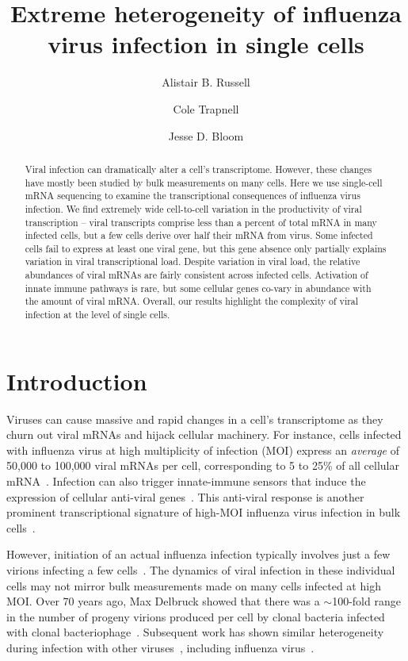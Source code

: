 \documentclass[9pt,lineno]{elife}
\title{Extreme heterogeneity of influenza virus infection in single cells}
\author[1]{Alistair B. Russell}
\author[2]{Cole Trapnell}
\author[1,2*]{Jesse D. Bloom}
\affil[1]{Basic Sciences Division and Computational Biology Program, Fred Hutchinson Cancer Research Center, Seattle, United States}
\affil[2]{Department of Genome Sciences, University of Washington, Seattle, United States}
\begin{document}
\maketitle

\begin{abstract}
Viral infection can dramatically alter a cell's transcriptome.
However, these changes have mostly been studied by bulk measurements on many cells.
Here we use single-cell mRNA sequencing to examine the transcriptional consequences of influenza virus infection.
We find extremely wide cell-to-cell variation in the productivity of viral transcription -- viral transcripts comprise less than a percent of total mRNA in many infected cells, but a few cells derive over half their mRNA from virus.
Some infected cells fail to express at least one viral gene, but this gene absence only partially explains variation in viral transcriptional load.
Despite variation in viral load, the relative abundances of viral mRNAs are fairly consistent across infected cells.
Activation of innate immune pathways is rare, but some cellular genes co-vary in abundance with the amount of viral mRNA.
Overall, our results highlight the complexity of viral infection at the level of single cells.
\end{abstract}

\section{Introduction}
Viruses can cause massive and rapid changes in a cell's transcriptome as they churn out viral mRNAs and hijack cellular machinery.
For instance, cells infected with influenza virus at high multiplicity of infection (MOI) express an \emph{average} of 50,000 to 100,000 viral mRNAs per cell, corresponding to 5 to 25\% of all cellular mRNA~\citep{hatada1989control}.
Infection can also trigger innate-immune sensors that induce the expression of cellular anti-viral genes~\citep{Killip:2015dw,Iwasaki:2014dw,crotta2013type}.
This anti-viral response is another prominent transcriptional signature of high-MOI influenza virus infection in bulk cells~\citep{Geiss:2002a}.

However, initiation of an actual influenza infection typically involves just a few virions infecting a few cells~\citep{varble2014influenza,poon2016quantifying,leonard2017transmission,mccrone2017evolutionary}. 
The dynamics of viral infection in these individual cells may not mirror bulk measurements made on many cells infected at high MOI.
Over 70 years ago, Max Delbruck showed that there was a $\sim$100-fold range in the number of progeny virions produced per cell by clonal bacteria infected with clonal bacteriophage~\citep{Delbruck:1945wo}.
Subsequent work has shown similar heterogeneity during infection with other viruses~\citep{zhu2009growth,Schulte:2014br,combe2015single,Akpinar:2016gt}, including influenza virus~\citep{Heldt:2015iz}.
\end{document}
